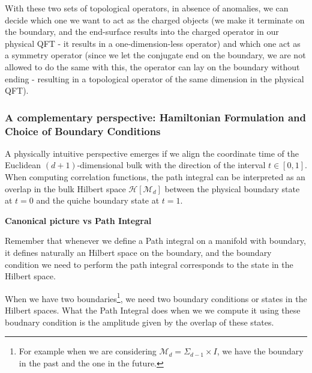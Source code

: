 \documentclass[aps,preprint,nofootinbib,preprintnumbers,eqsecnum,superscriptaddress]{revtex4}
\numberwithin{equation}{section}
\begin{document}
With these two sets of topological operators, in absence of anomalies, we can decide which one we want to act as the charged objects (we make it terminate on the boundary, and the end-surface results into the charged operator in our physical QFT - it results in a one-dimension-less operator) and which one act as a symmetry operator (since we let the conjugate end on the boundary, we are not allowed to do the same with this, the operator can lay on the boundary without ending - resulting in a topological operator of the same dimension in the physical QFT).

\subsubsection{A complementary perspective: Hamiltonian Formulation and Choice of Boundary Conditions}

A physically intuitive perspective emerges if we align the coordinate time of the Euclidean $(d+1)$-dimensional bulk with the direction of the interval $t \in [0,1]$. When computing correlation functions, the path integral can be interpreted as an overlap in the bulk Hilbert space $\mathcal{H}[\mathcal{M}_d]$ between the physical boundary state at $t=0$ and the quiche boundary state at $t=1$. 

\begin{tcolorbox}
    {\bf Canonical picture vs Path Integral}

    Remember that whenever we define a Path integral on a manifold with boundary, it defines naturally an Hilbert space on the boundary, and the boundary condition we need to perform the path integral corresponds to the state in the Hilbert space.

    When we have two boundaries\footnote{For example when we are considering $\mathcal{M}_{d} = \Sigma_{d-1}\times I$, we have the boundary in the past and the one in the future.}, we need two boundary conditions or states in the Hilbert spaces. What the Path Integral does when we we compute it using these boudnary condition is the amplitude given by the overlap of these states.
\end{tcolorbox}
\end{document}
